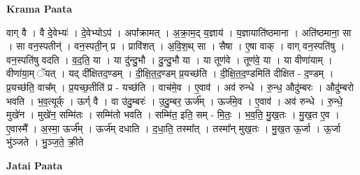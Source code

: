 \documentclass[17pt]{extarticle}
\begin{document}
\textbf{Krama Paata} \newline

वाग् वै । वै दे॒वेभ्यः॑ । दे॒वेभ्योऽप॑ । अपा᳚क्रामत् । अ॒क्रा॒म॒द् य॒ज्ञाय॑ । य॒ज्ञायाति॑ष्ठमाना । अति॑ष्ठमाना॒ सा । सा वन॒स्पतीन्॑ । वन॒स्पती॒न् प्र । प्रावि॑शत् । अ॒वि॒श॒थ् सा । सैषा । ए॒षा वाक् । वाग् वन॒स्पति॑षु । वन॒स्पति॑षु वदति । व॒द॒ति॒ या । या दु॑न्दु॒भौ । दु॒न्दु॒भौ या । या तूण॑वे । तूण॑वे॒ या । या वीणा॑याम् । वीणा॑या॒म् ॅयत् । यद् दी᳚क्षितद॒ण्डम् । दी॒क्षि॒त॒द॒ण्डम् प्र॒यच्छ॑ति । दी॒क्षि॒त॒द॒ण्डमिति॑ दीक्षित - द॒ण्डम् । प्र॒यच्छ॑ति॒ वाच᳚म् । प्र॒यच्छ॒तीति॑ प्र - यच्छ॑ति । वाच॑मे॒व । ए॒वाव॑ । अव॑ रुन्धे । रु॒न्ध॒ औदु॑म्बरः । औदु॑म्बरो भवति । भ॒व॒त्यूर्क् । ऊर्ग् वै । वा उ॑दु॒म्बरः॑ । उ॒दु॒म्बर॒ ऊर्ज᳚म् । ऊर्ज॑मे॒व । ए॒वाव॑ । अव॑ रुन्धे । रु॒न्धे॒ मुखे॑न । मुखे॑न॒ सम्मि॑तः । सम्मि॑तो भवति । सम्मि॑त॒ इति॒ सम् - मि॒तः॒ । भ॒व॒ति॒ मु॒ख॒तः । मु॒ख॒त ए॒व । ए॒वास्मै᳚ । अ॒स्मा॒ ऊर्ज᳚म् । ऊर्ज॑म् दधाति । द॒धा॒ति॒ तस्मा᳚त् । तस्मा᳚न् मुख॒तः । मु॒ख॒त ऊ॒र्जा । ऊ॒र्जा भु॑ञ्जते । भु॒ञ्ज॒ते॒ क्री॒ते \newline

\textbf{Jatai Paata} \newline
\end{document}
